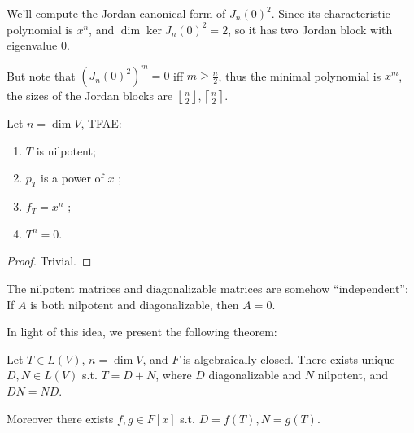 \begin{example}
    We'll compute the Jordan canonical form of $J_n(0)^2$.
	Since its characteristic polynomial is $x^n$, and $\dim \ker J_n(0)^2 = 2$,
	so it has two Jordan block with eigenvalue 0.

	But note that $(J_n(0)^2)^m = 0$ iff $m\ge \frac{n}{2}$, thus
	the minimal polynomial is $x^m$, the sizes of the Jordan blocks
	are $\left\lfloor \frac{n}{2} \right\rfloor, \left\lceil \frac{n}{2} \right\rceil$.
\end{example}

\begin{proposition}
	Let $n = \dim V$, TFAE:
	\begin{enumerate}[(1)]
		\item $T$ is nilpotent;
		\item $p_T$ is a power of $x$ ;
		\item $f_T = x^n$ ;
		\item $T^n = 0$.
	\end{enumerate}
\end{proposition}
\begin{proof}[Proof]
	Trivial.
\end{proof}

The nilpotent matrices and diagonalizable matrices are somehow ``independent'':
If $A$ is both nilpotent and diagonalizable, then $A = 0$.

In light of this idea, we present the following theorem:
\begin{theorem}
    Let $T\in L(V)$, $n = \dim V$, and $F$ is algebraically closed.
	There exists unique $D,N\in L(V)$ s.t. $T = D+N$, where $D$ diagonalizable and
	$N$ nilpotent, and $DN = ND$.

	Moreover there exists $f,g\in F[x]$ s.t. $D = f(T), N = g(T)$.
\end{theorem}

